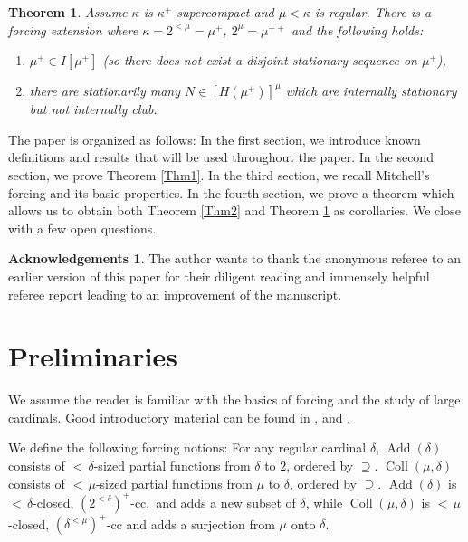 \documentclass[a4paper]{amsart}
\theoremstyle{definition}
\newtheorem*{myack}{Acknowledgements}
\theoremstyle{remark}
\theoremstyle{plain}
\newtheorem{mythm}{Theorem}
\numberwithin{mydef}{section}
\DeclareMathOperator{\Add}{Add}
\DeclareMathOperator{\Coll}{Coll}
\begin{document}
	\begin{mythm}\label{Thm3}
		Assume $\kappa$ is $\kappa^+$-supercompact and $\mu<\kappa$ is regular. There is a forcing extension where $\kappa=2^{<\mu}=\mu^+$, $2^{\mu}=\mu^{++}$ and the following holds:
		\begin{enumerate}
			\item $\mu^+\in I[\mu^+]$ (so there does not exist a disjoint stationary sequence on $\mu^+$),
			\item there are stationarily many $N\in[H(\mu^+)]^{\mu}$ which are internally stationary but not internally club.
		\end{enumerate}
	\end{mythm}
	
	The paper is organized as follows: In the first section, we introduce known definitions and results that will be used throughout the paper. In the second section, we prove Theorem \ref{Thm1}. In the third section, we recall Mitchell's forcing and its basic properties. In the fourth section, we prove a theorem which allows us to obtain both Theorem \ref{Thm2} and Theorem \ref{Thm3} as corollaries. We close with a few open questions.
	
	\begin{myack}
		The author wants to thank the anonymous referee to an earlier version of this paper for their diligent reading and immensely helpful referee report leading to an improvement of the manuscript.
	\end{myack}
	
	\section{Preliminaries}
	
	We assume the reader is familiar with the basics of forcing and the study of large cardinals. Good introductory material can be found in \cite{JechSetTheory}, \cite{KunenSetTheory} and \cite{KanamoriHigherInfinite}.
	
	We define the following forcing notions: For any regular cardinal $\delta$, $\Add(\delta)$ consists of ${<}\,\delta$-sized partial functions from $\delta$ to $2$, ordered by $\supseteq$. $\Coll(\mu,\delta)$ consists of ${<}\,\mu$-sized partial functions from $\mu$ to $\delta$, ordered by $\supseteq$. $\Add(\delta)$ is ${<}\,\delta$-closed, $(2^{<\delta})^+$-cc.\ and adds a new subset of $\delta$, while $\Coll(\mu,\delta)$ is ${<}\,\mu$-closed, $(\delta^{<\mu})^+$-cc and adds a surjection from $\mu$ onto $\delta$.
	
\end{document}
